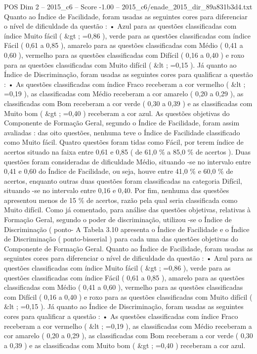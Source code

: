 \begin{textsample}{POS Dim 2 – 2015\_c6 – Score -1.00 – 2015\_c6/enade\_2015\_dir\_89a831b3d4.txt}
Quanto ao Índice de Facilidade, foram usadas as seguintes cores para diferenciar o nível de dificuldade da questão : • Azul para as questões classificadas com índice Muito fácil ( \&gt ; =0,86 ), verde para as questões classificadas com índice Fácil ( 0,61 a 0,85 ), amarelo para as questões classificadas com Médio ( 0,41 a 0,60 ), vermelho para as questões classificadas com Difícil ( 0,16 a 0,40 ) e roxo para as questões classificadas com Muito difícil ( \&lt ; =0,15 ).
Já quanto ao Índice de Discriminação, foram usadas as seguintes cores para qualificar a questão : • As questões classificadas com índice Fraco receberam a cor vermelho ( \&lt ; =0,19 ), as classificadas com Médio receberam a cor amarelo ( 0,20 a 0,29 ), as classificadas com Bom receberam a cor verde ( 0,30 a 0,39 ) e as classificadas com Muito bom ( \&gt ; =0,40 ) receberam a cor azul.
As questões objetivas do Componente de Formação Geral, segundo o Índice de Facilidade, foram assim avaliadas : das oito questões, nenhuma teve o Índice de Facilidade classificado como Muito fácil.
Quatro questões foram tidas como Fácil, por terem índice de acertos situado na faixa entre 0,61 e 0,85 ( de 61,0 \% a 85,0 \% de acertos ).
Duas questões foram consideradas de dificuldade Médio, situando -se no intervalo entre 0,41 e 0,60 do Índice de Facilidade, ou seja, houve entre 41,0 \% e 60,0 \% de acertos, enquanto outras duas questões foram classificadas na categoria Difícil, situando -se no intervalo entre 0,16 e 0,40.
Por fim, nenhuma das questões apresentou menos de 15 \% de acertos, razão pela qual seria classificada como Muito difícil.
Como já comentado, para análise das questões objetivas, relativas à Formação Geral, segundo o poder de discriminação, utilizou -se o Índice de Discriminação ( ponto- A Tabela 3.10 apresenta o Índice de Facilidade e o Índice de Discriminação ( ponto-bisserial ) para cada uma das questões objetivas do Componente de Formação Geral.
Quanto ao Índice de Facilidade, foram usadas as seguintes cores para diferenciar o nível de dificuldade da questão : • Azul para as questões classificadas com índice Muito fácil ( \&gt ; =0,86 ), verde para as questões classificadas com índice Fácil ( 0,61 a 0,85 ), amarelo para as questões classificadas com Médio ( 0,41 a 0,60 ), vermelho para as questões classificadas com Difícil ( 0,16 a 0,40 ) e roxo para as questões classificadas com Muito difícil ( \&lt ; =0,15 ).
Já quanto ao Índice de Discriminação, foram usadas as seguintes cores para qualificar a questão : • As questões classificadas com índice Fraco receberam a cor vermelho ( \&lt ; =0,19 ), as classificadas com Médio receberam a cor amarelo ( 0,20 a 0,29 ), as classificadas com Bom receberam a cor verde ( 0,30 a 0,39 ) e as classificadas com Muito bom ( \&gt ; =0,40 ) receberam a cor azul.

\end{textsample}
